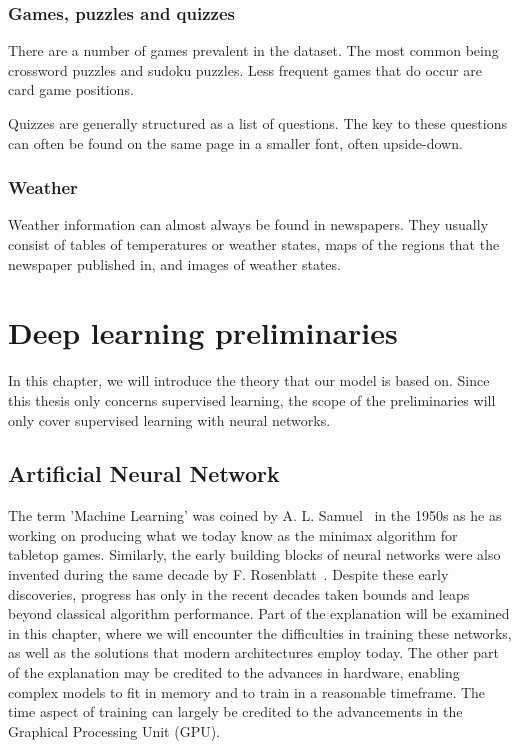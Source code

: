 \documentclass[english, bibtex]{kththesis}
\begin{document}
\subsubsection{Games, puzzles and quizzes}

There are a number of games prevalent in the dataset. The most common being crossword puzzles and sudoku puzzles. Less frequent games that do occur are card game positions.

Quizzes are generally structured as a list of questions. The key to these questions can often be found on the same page in a smaller font, often upside-down.

\subsubsection{Weather}

Weather information can almost always be found in newspapers. They usually consist of tables of temperatures or weather states, maps of the regions that the newspaper published in, and images of weather states. 



\section{Deep learning preliminaries}
\label{sec:preliminaries}

In this chapter, we will introduce the theory that our model is based on. Since this thesis only concerns supervised learning, the scope of the preliminaries will only cover supervised learning with neural networks.

\subsection{Artificial Neural Network}

The term 'Machine Learning' was coined by A. L. Samuel~\cite{samuela1959} in the 1950s as he as working on producing what we today know as the minimax algorithm for tabletop games. Similarly, the early building blocks of neural networks were also invented during the same decade by F. Rosenblatt~\cite{rosenblatt1958perceptron}. Despite these early discoveries, progress has only in the recent decades taken bounds and leaps beyond classical algorithm performance. Part of the explanation will be examined in this chapter, where we will encounter the difficulties in training these networks, as well as the solutions that modern architectures employ today. The other part of the explanation may be credited to the advances in hardware, enabling complex models to fit in memory and to train in a reasonable timeframe. The time aspect of training can largely be credited to the advancements in the Graphical Processing Unit (GPU).    
\end{document}
